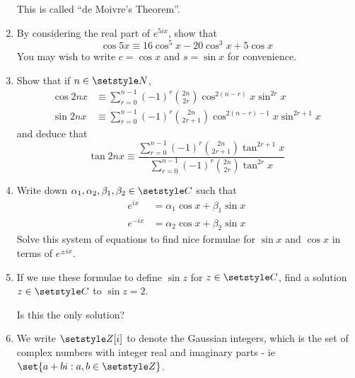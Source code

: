 \begin{enumerate}
  This is called ``de Moivre's Theorem''.
 \item
  By considering the real part of \(e^{5ix}\), show that
  \begin{equation*}
   \cos 5x \equiv 16\cos^5 x - 20\cos^3 x + 5\cos x
  \end{equation*}
  You may wish to write \(c = \cos x\) and \(s = \sin x\) for convenience.
 \item
  Show that if \(n \in \Naturals\),
  \begin{align*}
   \cos 2nx &\equiv
    \sum_{r = 0}^{n - 1}
     (-1)^r \binom{2n}{2r} \cos^{2(n - r)} x \sin^{2r} x \\
   \sin 2nx &\equiv
    \sum_{r = 0}^{n - 1}
     (-1)^r \binom{2n}{2r + 1} \cos^{2(n - r) - 1} x \sin^{2r + 1} x
  \end{align*}
  and deduce that
  \begin{equation*}
   \tan 2nx \equiv
   \frac{\sum_{r = 0}^{n - 1} (-1)^r \binom{2n}{2r + 1} \tan^{2r + 1} x}
        {\sum_{r = 0}^{n - 1} (-1)^r \binom{2n}{2r} \tan^{2r} x}
  \end{equation*}
 \item
  Write down \(\alpha_1, \alpha_2, \beta_1, \beta_2 \in \Complex\) such that
  \begin{align*}
   e^{ix} &= \alpha_1 \cos x + \beta_1 \sin x \\
   e^{-ix} &= \alpha_2 \cos x + \beta_2 \sin x
  \end{align*}
  Solve this system of equations to find nice formulae for
  \(\sin x\) and \(\cos x\) in terms of \(e^{\pm ix}\).
 \item
  If we use these formulae to define \(\sin z\) for \(z \in \Complex\), find a
  solution \(z \in \Complex\) to \(\sin z = 2\).

  Is this the only solution?
 \item
  We write \(\Integers[i]\) to denote the Gaussian integers, which is the set of
  complex numbers with integer real and imaginary parts - ie
  \(\set{a + bi : a, b \in \Integers}\).


\end{enumerate}
